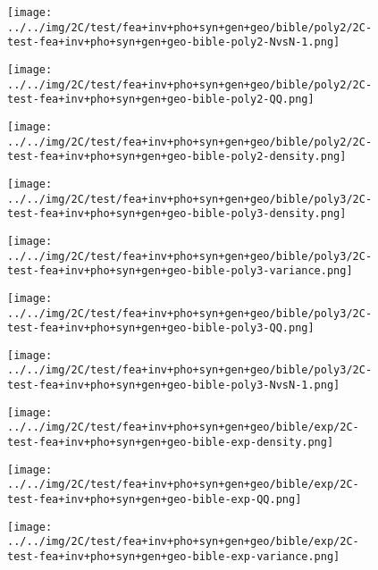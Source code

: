 \begin{figure}[H]
\centering	\texttt{[image: ../../img/2C/test/fea+inv+pho+syn+gen+geo/bible/poly2/2C-test-fea+inv+pho+syn+gen+geo-bible-poly2-NvsN-1.png]}
\end{figure}
\begin{figure}[H]
\centering	\texttt{[image: ../../img/2C/test/fea+inv+pho+syn+gen+geo/bible/poly2/2C-test-fea+inv+pho+syn+gen+geo-bible-poly2-QQ.png]}
\end{figure}
\begin{figure}[H]
\centering	\texttt{[image: ../../img/2C/test/fea+inv+pho+syn+gen+geo/bible/poly2/2C-test-fea+inv+pho+syn+gen+geo-bible-poly2-density.png]}
\end{figure}
\begin{figure}[H]
\centering	\texttt{[image: ../../img/2C/test/fea+inv+pho+syn+gen+geo/bible/poly3/2C-test-fea+inv+pho+syn+gen+geo-bible-poly3-density.png]}
\end{figure}
\begin{figure}[H]
\centering	\texttt{[image: ../../img/2C/test/fea+inv+pho+syn+gen+geo/bible/poly3/2C-test-fea+inv+pho+syn+gen+geo-bible-poly3-variance.png]}
\end{figure}
\begin{figure}[H]
\centering	\texttt{[image: ../../img/2C/test/fea+inv+pho+syn+gen+geo/bible/poly3/2C-test-fea+inv+pho+syn+gen+geo-bible-poly3-QQ.png]}
\end{figure}
\begin{figure}[H]
\centering	\texttt{[image: ../../img/2C/test/fea+inv+pho+syn+gen+geo/bible/poly3/2C-test-fea+inv+pho+syn+gen+geo-bible-poly3-NvsN-1.png]}
\end{figure}
\begin{figure}[H]
\centering	\texttt{[image: ../../img/2C/test/fea+inv+pho+syn+gen+geo/bible/exp/2C-test-fea+inv+pho+syn+gen+geo-bible-exp-density.png]}
\end{figure}
\begin{figure}[H]
\centering	\texttt{[image: ../../img/2C/test/fea+inv+pho+syn+gen+geo/bible/exp/2C-test-fea+inv+pho+syn+gen+geo-bible-exp-QQ.png]}
\end{figure}
\begin{figure}[H]
\centering	\texttt{[image: ../../img/2C/test/fea+inv+pho+syn+gen+geo/bible/exp/2C-test-fea+inv+pho+syn+gen+geo-bible-exp-variance.png]}
\end{figure}
